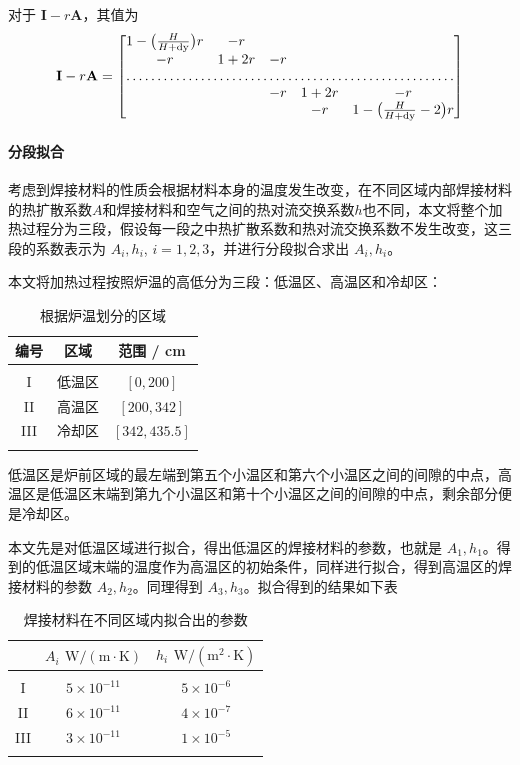 \documentclass[../main.tex]{subfiles}
\begin{document}
对于 \(\mathbf{I} - r \mathbf{A}\)，其值为
\begin{equation}
\mathbf{I} - r \mathbf{A} =
\begin{bmatrix}
1 - \big(\frac{H}{H + \mathrm{dy}}\big) r & -r \\
-r & 1 + 2r & -r \\
\hdotsfor{5}\\
&&-r & 1 + 2r & -r \\
&&& -r & 1 - \big(\frac{H}{H + \mathrm{dy}}- 2\big)r
\end{bmatrix}
\end{equation}

\paragraph{分段拟合} 考虑到焊接材料的性质会根据材料本身的温度发生改变，在不同区域内部焊接材料的热扩散系数\(A\)和焊接材料和空气之间的热对流交换系数\(h\)也不同，本文将整个加热过程分为三段，假设每一段之中热扩散系数和热对流交换系数不发生改变，这三段的系数表示为 \(A_{i}, h_{i}\), \(i = 1 , 2 ,3 \)，并进行分段拟合求出 \(A_{i} ,h_{i}\)。

本文将加热过程按照炉温的高低分为三段：低温区、高温区和冷却区：
\begin{table}[H]
\centering
\begin{tabular}{ccc}
编号&区域 & 范围 / cm \\ \hline \hline
\\ [-1em]
I&低温区& \([0 , 200]\) \\
II&高温区& \([200, 342]\) \\
III&冷却区& \([342, 435.5]\)
\\ [-1em]
\\ \hline
\end{tabular}\caption{根据炉温划分的区域}
\end{table}
低温区是炉前区域的最左端到第五个小温区和第六个小温区之间的间隙的中点，高温区是低温区末端到第九个小温区和第十个小温区之间的间隙的中点，剩余部分便是冷却区。

本文先是对低温区域进行拟合，得出低温区的焊接材料的参数，也就是 \(A_{1}, h_{1}\)。得到的低温区域末端的温度作为高温区的初始条件，同样进行拟合，得到高温区的焊接材料的参数 \(A_{2}, h_{2}\)。同理得到 \(A_{3}, h_{3}\)。拟合得到的结果如下表
\begin{table}[H]
\centering
\begin{tabular}{ccc}
& \(A_{i}\) \(\mathrm{W}/ (\mathrm{m}\cdot \mathrm{K})\) & \(h_{i}\) \(\mathrm{W} / (\mathrm{m}^{2} \cdot \mathrm{K})\) \\ \hline \hline
\\[-1em]
I & \(5 \times 10 ^{-11}\) & \(5 \times 10 ^{-6}\) \\
II & \(6 \times 10 ^{-11}\) & \(4 \times 10 ^{-7}\) \\
III & \(3 \times 10 ^{-11}\) & \(1 \times 10 ^{-5}\)
\\[-1em]
\\ \hline
\end{tabular}\caption{焊接材料在不同区域内拟合出的参数}
\end{table}
\end{document}
